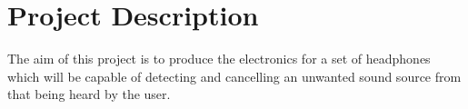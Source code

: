 \newpage
\section{Project Description}
The aim of this project is to produce the electronics for a set of headphones which will be capable of detecting and cancelling an unwanted sound source from that being heard by the user.
